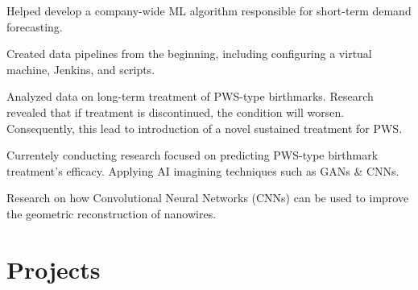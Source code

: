 \documentclass[]{CV}
\begin{document}
\begin{minipage}[t]{0.705\textwidth}
\begin{tightemize}
\quad
\end{tightemize}

\vspace{\topsep} %
\begin{tightemize}

\item Helped develop a company-wide ML algorithm responsible for short-term demand forecasting.

\item Created data pipelines from the beginning, including configuring a virtual machine, Jenkins, and scripts.

\end{tightemize}


\vspace{\topsep}
\begin{tightemize}

\item Analyzed data on long-term treatment of PWS-type birthmarks.  Research revealed that if treatment is discontinued, the condition will worsen. Consequently, this lead to introduction of a novel sustained treatment for PWS.

\item Currentely conducting research focused on predicting PWS-type birthmark treatment's efficacy. Applying AI imagining techniques such as GANs \& CNNs. 


\end{tightemize}
\sectionsep

\vspace{\topsep} %
\begin{tightemize}
\item Research on how Convolutional Neural Networks (CNNs) can be used to improve the geometric reconstruction of nanowires.


\end{tightemize}



\section{Projects}
\begin{tightemize}


\end{tightemize}
\end{minipage}
\end{document}
